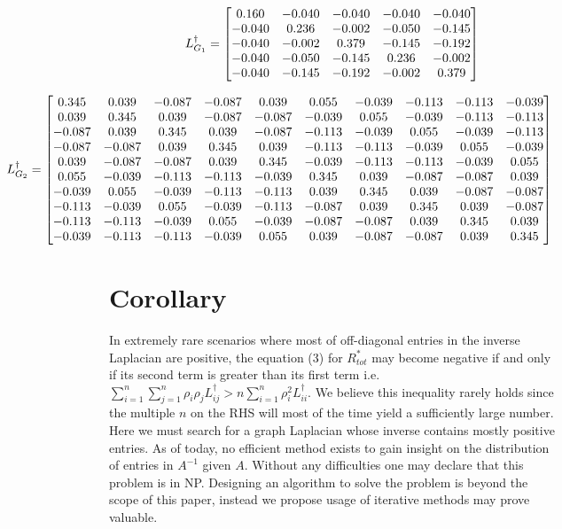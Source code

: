 \documentclass{article}
\begin{document}
	\hspace{2pt}
	
	\[
	L^{\dag}_{G_1}=
	\begin{bmatrix}
		0.160 & -0.040 & -0.040 & -0.040 & -0.040 \cr
		-0.040 &  0.236 & -0.002 & -0.050 & -0.145 \cr
		-0.040 & -0.002 &  0.379 & -0.145 & -0.192 \cr
		-0.040 & -0.050 & -0.145 &  0.236 & -0.002 \cr
		-0.040 & -0.145 & -0.192 & -0.002 &  0.379
	\end{bmatrix}
	\]
	
	\setlength{\leftskip}{-3cm}
	\begin{equation*}
		\hspace*{-3cm}
		L^{\dag}_{G_2}=
		\begin{bmatrix}
			0.345 &  0.039 & -0.087 & -0.087 &  0.039 &  0.055 & -0.039 & -0.113 & -0.113 & -0.039 \cr
			0.039 &  0.345 &  0.039 & -0.087 & -0.087 & -0.039 &  0.055 & -0.039 & -0.113 & -0.113 \cr
			-0.087 &  0.039 &  0.345 &  0.039 & -0.087 & -0.113 & -0.039 &  0.055 & -0.039 & -0.113 \cr
			-0.087 & -0.087 &  0.039 &  0.345 &  0.039 & -0.113 & -0.113 & -0.039 &  0.055 & -0.039 \cr
			0.039 & -0.087 & -0.087 &  0.039 &  0.345 & -0.039 & -0.113 & -0.113 & -0.039 &  0.055 \cr
			0.055 & -0.039 & -0.113 & -0.113 & -0.039 &  0.345 &  0.039 & -0.087 & -0.087 &  0.039 \cr
			-0.039 &  0.055 & -0.039 & -0.113 & -0.113 &  0.039 &  0.345 &  0.039 & -0.087 & -0.087 \cr
			-0.113 & -0.039 &  0.055 & -0.039 & -0.113 & -0.087 &  0.039 &  0.345 &  0.039 & -0.087 \cr
			-0.113 & -0.113 & -0.039 &  0.055 & -0.039 & -0.087 & -0.087 &  0.039 &  0.345 &  0.039 \cr
			-0.039 & -0.113 & -0.113 & -0.039 &  0.055 &  0.039 & -0.087 & -0.087 &  0.039 &  0.345
		\end{bmatrix}
	\end{equation*}
	\setlength{\leftskip}{0pt}
	
	\section*{Corollary}
	In extremely rare scenarios where most of off-diagonal entries in the inverse Laplacian are positive, the equation (3) for $R^{\ast}_{tot}$ may become negative if and only if its second term is greater than its first term i.e. $\sum_{i=1}^{n}\sum_{j=1}^{n} \rho_i\rho_j L_{ij}^{\dag} > n\sum_{i=1}^{n} \rho_i^{2}L_{ii}^{\dag}$. We believe this inequality rarely holds since the multiple $n$ on the RHS will most of the time yield a sufficiently large number. Here we must search for a graph Laplacian whose inverse contains mostly positive entries. As of today, no efficient method exists to gain insight on the distribution of entries in $A^{-1}$ given $A$. Without any difficulties one may declare that this problem is in NP. Designing an algorithm to solve the problem is beyond the scope of this paper, instead we propose usage of iterative methods \cite{corderoinverse}\cite{ZAKAULLAH2014441} may prove valuable.
	
\end{document}

